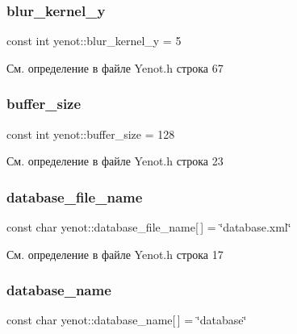 \mbox{\label{namespaceyenot_ad178c04ee8518b1553ee1ab5b5054712}} 
\subsubsection{\texorpdfstring{blur\+\_\+kernel\+\_\+y}{blur\_kernel\_y}}
{\footnotesize\ttfamily const int yenot\+::blur\+\_\+kernel\+\_\+y = 5}



См. определение в файле Yenot.\+h строка 67

\mbox{\label{namespaceyenot_adc382d9413986f36649df4f983cf1ebe}} 
\subsubsection{\texorpdfstring{buffer\+\_\+size}{buffer\_size}}
{\footnotesize\ttfamily const int yenot\+::buffer\+\_\+size = 128}



См. определение в файле Yenot.\+h строка 23

\mbox{\label{namespaceyenot_ac18180ab326731ce58145fe9049c49b9}} 
\subsubsection{\texorpdfstring{database\+\_\+file\+\_\+name}{database\_file\_name}}
{\footnotesize\ttfamily const char yenot\+::database\+\_\+file\+\_\+name\mbox{[}$\,$\mbox{]} = \char`\"{}database.\+xml\char`\"{}}



См. определение в файле Yenot.\+h строка 17

\mbox{\label{namespaceyenot_a5c402b62f742f34e9e42756075df6ed2}} 
\subsubsection{\texorpdfstring{database\+\_\+name}{database\_name}}
{\footnotesize\ttfamily const char yenot\+::database\+\_\+name\mbox{[}$\,$\mbox{]} = \char`\"{}database\char`\"{}}



